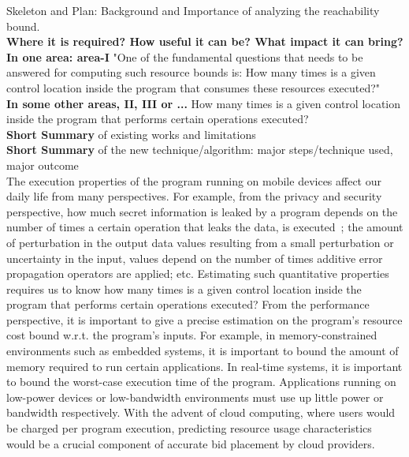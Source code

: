 Skeleton and Plan: Background and Importance of analyzing the reachability bound.
\\
\textbf{Where it is required? How useful it can be? What impact it can bring?}
\\
\textbf{In one area: area-I}
"One of the fundamental questions that needs to be answered for computing such resource bounds is: 
How many times is a given control location inside the program that consumes these resources executed?"
\\
\textbf{In some other areas, II, III or ...}
How many times is a given control location inside the program that performs certain operations executed?
\\
\textbf{Short Summary} of existing works and limitations
\\
\textbf{Short Summary} of the new technique/algorithm: major steps/technique used,  major outcome
\\
The execution properties of the program running on mobile devices affect our daily life from many perspectives.
For example,
from the privacy and security perspective,
how much secret information is leaked by a program depends on the number of times a certain operation that leaks the data,
is executed~\cite{Malacaria07};
the amount of perturbation in the output data values resulting
from a small perturbation or uncertainty in the input,
values depend on the number of times additive error propagation operators are applied; etc.
Estimating such quantitative properties requires us to know
how many times is a given control location inside the program that performs certain operations executed?
From the performance perspective, it is important to give a precise estimation
on the program's resource cost bound w.r.t. the program's inputs.
For example, in memory-constrained environments such as embedded systems,
it is important to bound the amount of memory required to run certain applications.
In real-time systems, it is important to bound the worst-case execution time of the program.
Applications running on low-power devices or low-bandwidth environments must use up little power or bandwidth respectively. 
With the advent of cloud computing, where users would be charged per program execution,
predicting resource usage characteristics would be a crucial component of accurate bid placement by cloud providers. 
